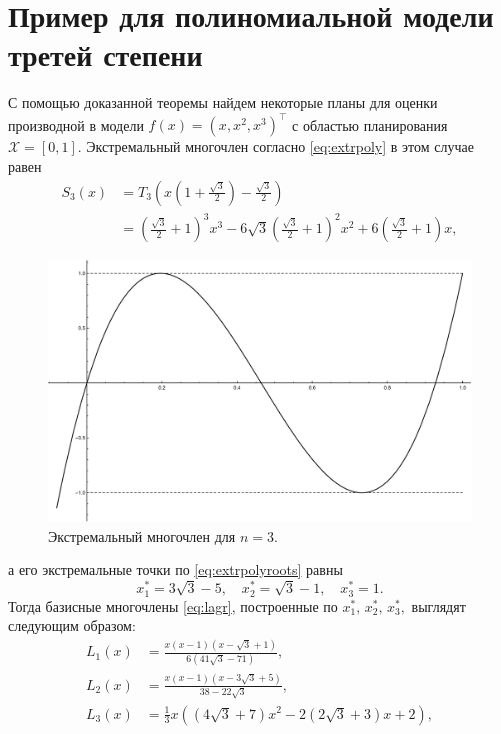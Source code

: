 \documentclass[specialist,
               substylefile = spbu.rtx,
               subf,href,colorlinks=true, 12pt]{disser}
\theoremstyle{definition}
\begin{document}
	\section{Пример для полиномиальной модели третей степени}
	С помощью доказанной теоремы найдем некоторые планы для оценки производной в модели $f(x)  = (x, x^2, x^3)^\top$ с областью планирования $\mathcal{X} = [0, 1]$. Экстремальный многочлен согласно \eqref{eq:extrpoly} в этом случае равен 
	\begin{align*}
		S_3(x) &= T_3\left(x \left(1 + \frac{\sqrt{3}}{2} \right) -  \frac{\sqrt{3}}{2} \right) \\ 
		&= \left(\frac{\sqrt{3}}{2}+1\right)^3 x^3-6 \sqrt{3} \left(\frac{\sqrt{3}}{2}+1\right)^2 x^2+6 \left(\frac{\sqrt{3}}{2}+1\right) x,
	\end{align*}
	\begin{figure}
		\includegraphics[width=\textwidth]{fig/s3.pdf}
		\caption{Экстремальный многочлен для $n = 3$.}
	\end{figure}
	а его экстремальные точки по \eqref{eq:extrpolyroots} равны 
	\begin{equation}
	\label{eq:ex:point}
		x_1^* = 3 \sqrt{3} - 5, \quad x_2^* = \sqrt{3} - 1 , \quad x_3^* = 1.
	\end{equation}
	Тогда базисные многочлены \eqref{eq:lagr}, построенные по $x_1^*, \,x_2^*, \,x_3^*,$  выглядят следующим образом:
	\begin{align*}
		L_1(x) &= \frac{x (x - 1) (x - \sqrt{3} + 1)}{6 (41 \sqrt{3} - 71)}, \\
		L_2(x) &= \frac{x (x - 1) \left(x-3 \sqrt{3}+5\right)}{38 - 22 \sqrt{3}},\\
		L_3(x) &= \frac{1}{3} x \left(\left(4 \sqrt{3}+7\right) x^2-2 \left(2 \sqrt{3}+3\right) x+2\right) ,
	\end{align*}
\end{document}
